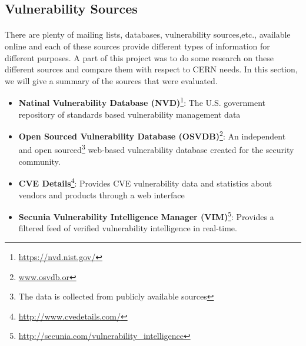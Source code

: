 \subsection{Vulnerability Sources}
\label{vuln_sources}
\paragraph{}
There are plenty of mailing lists, databases, vulnerability sources,etc., available online and each of these sources provide different types of information for different purposes. A part of this project was to do some research on these different sources and compare them with respect to CERN needs. In this section, we will give a summary of the sources that were evaluated. 
\begin{itemize}
\item \textbf{Natinal Vulnerability Database (NVD)}\footnote{\url{https://nvd.nist.gov/}}: The U.S. government repository of standards based vulnerability management data
\item \textbf{Open Sourced Vulnerability Database (OSVDB)}\footnote{\url{www.osvdb.or}}: An independent and open sourced\footnote{The data is collected from publicly available sources} web-based vulnerability database created for the security community. 
\item \textbf{CVE Details}\footnote{\url{http://www.cvedetails.com/}}: Provides CVE vulnerability data and statistics about vendors and products through a web interface
\item \textbf{Secunia Vulnerability Intelligence Manager (VIM)}\footnote{\url{http://secunia.com/vulnerability_intelligence}}: Provides a filtered feed of verified vulnerability intelligence in real-time.

\end{itemize}

